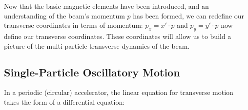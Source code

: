 \documentclass[11pt]{report}
\begin{document}




Now that the basic magnetic elements have been introduced, and an understanding of the beam's momentum $p$ has been formed, we can redefine our transverse coordinates in terms of momentum: $p_x=x'\cdot p$ and $p_y=y'\cdot p$ now define our transverse coordinates. These coordinates will allow us to build a picture of the multi-particle transverse dynamics of the beam.

\subsection{Single-Particle Oscillatory Motion}



In a periodic (circular) accelerator, the linear equation for transverse motion takes the form of a differential equation:
\end{document}
